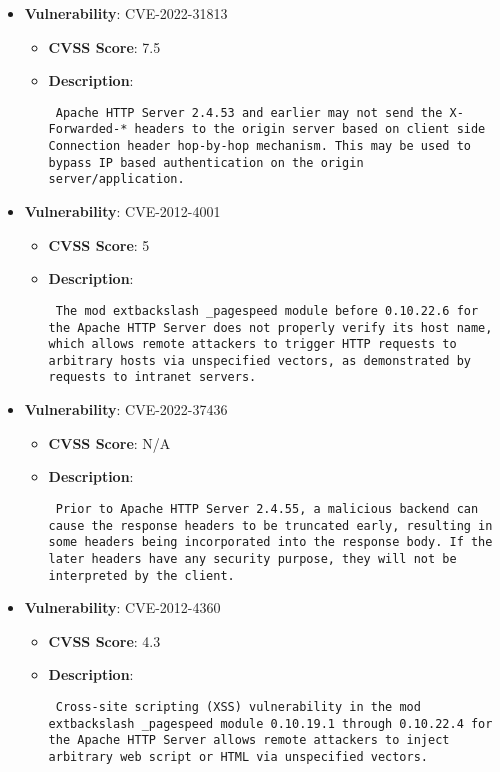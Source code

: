 \documentclass{article}
\begin{document}
\begin{itemize}
        \item \textbf{Vulnerability}: CVE-2022-31813
        \begin{itemize}
            \item \textbf{CVSS Score}:  7.5 
            \item \textbf{Description}: \parbox{\linewidth}{\texttt{ Apache HTTP Server 2.4.53 and earlier may not send the X-Forwarded-* headers to the origin server based on client side Connection header hop-by-hop mechanism. This may be used to bypass IP based authentication on the origin server/application. }}
        \end{itemize}
    
        \item \textbf{Vulnerability}: CVE-2012-4001
        \begin{itemize}
            \item \textbf{CVSS Score}:  5 
            \item \textbf{Description}: \parbox{\linewidth}{\texttt{ The mod	extbackslash _pagespeed module before 0.10.22.6 for the Apache HTTP Server does not properly verify its host name, which allows remote attackers to trigger HTTP requests to arbitrary hosts via unspecified vectors, as demonstrated by requests to intranet servers. }}
        \end{itemize}
    
        \item \textbf{Vulnerability}: CVE-2022-37436
        \begin{itemize}
            \item \textbf{CVSS Score}:  N/A 
            \item \textbf{Description}: \parbox{\linewidth}{\texttt{ Prior to Apache HTTP Server 2.4.55, a malicious backend can cause the response headers to be truncated early, resulting in some headers being incorporated into the response body. If the later headers have any security purpose, they will not be interpreted by the client. }}
        \end{itemize}
    
        \item \textbf{Vulnerability}: CVE-2012-4360
        \begin{itemize}
            \item \textbf{CVSS Score}:  4.3 
            \item \textbf{Description}: \parbox{\linewidth}{\texttt{ Cross-site scripting (XSS) vulnerability in the mod	extbackslash _pagespeed module 0.10.19.1 through 0.10.22.4 for the Apache HTTP Server allows remote attackers to inject arbitrary web script or HTML via unspecified vectors. }}
        \end{itemize}
    

\end{itemize}
\end{document}
